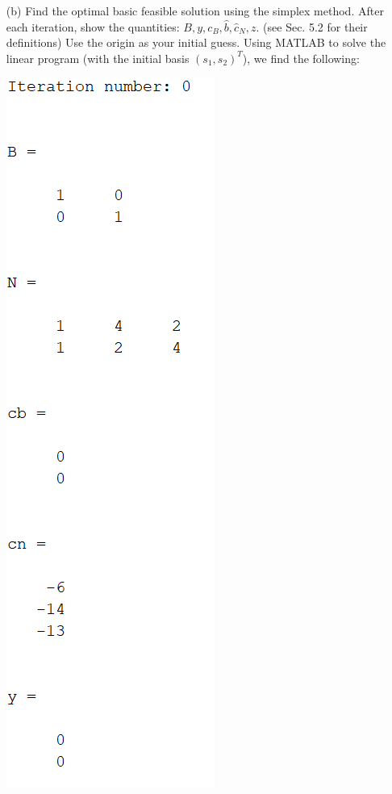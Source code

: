 \documentclass{article}
\begin{document}
\begin{itemize}
\begin{itemize}
        \item[(b)] Find the optimal basic feasible solution using the simplex method. After each iteration, show the quantities: $B, y, c_B, \hat{b}, \hat{c}_N, z$. (see Sec. 5.2 for their definitions) Use the origin as your initial guess.
        \newline\newline
        Using MATLAB to solve the linear program (with the initial basis $(s_1,s_2)^T$), we find the following:
        \begin{center}
            \includegraphics[scale = 0.65]{iteration0Prob1}

\end{center}
\end{itemize}
\end{itemize}
\end{document}
